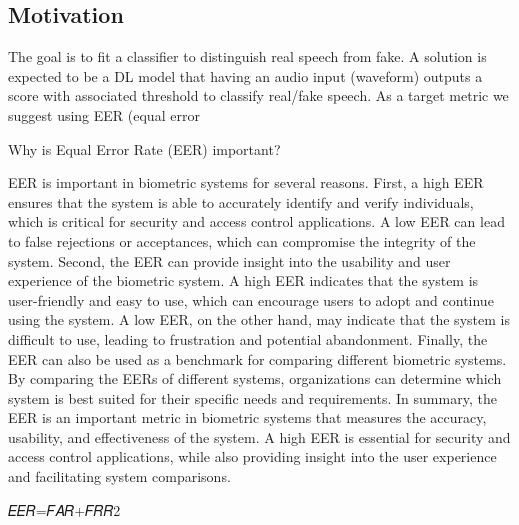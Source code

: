 \documentclass[hyperref={pdfpagelabels=false}, color=table]{beamer}
\begin{document}
    \subsection{Motivation}
    \begin{frame}

            The goal is to fit a classifier to distinguish real speech from fake. A solution is expected to
            be a DL model that having an audio input (waveform) outputs a score with associated
            threshold to classify real/fake speech. As a target metric we suggest using EER (equal error




            \end{frame}
    \begin{frame}
            Why is Equal Error Rate (EER) important?

            EER is important in biometric systems for several reasons.
            First, a high EER ensures that the system is able to accurately identify and verify individuals, which is critical for security and access control applications.
            A low EER can lead to false rejections or acceptances, which can compromise the integrity of the system.
            Second, the EER can provide insight into the usability and user experience of the biometric system.
            A high EER indicates that the system is user-friendly and easy to use, which can encourage users to adopt and continue using the system.
            A low EER, on the other hand, may indicate that the system is difficult to use, leading to frustration and potential abandonment.
            Finally, the EER can also be used as a benchmark for comparing different biometric systems.
            By comparing the EERs of different systems, organizations can determine which system is best suited for their specific needs and requirements.
            In summary, the EER is an important metric in biometric systems that measures the accuracy, usability, and effectiveness of the system.
            A high EER is essential for security and access control applications, while also providing insight into the user experience and facilitating system comparisons.




            𝐸𝐸𝑅=𝐹𝐴𝑅+𝐹𝑅𝑅2

    \end{frame}


    
\end{document}
